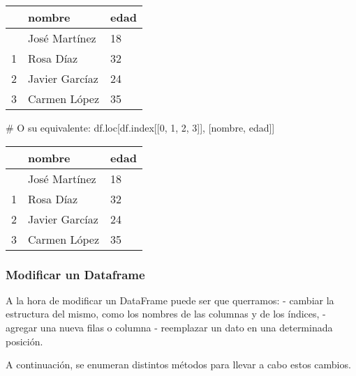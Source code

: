 \documentclass[
  letterpaper,
  DIV=11,
  numbers=noendperiod]{scrreprt}
\newenvironment{Shaded}{\begin{snugshade}}{\end{snugshade}}
\newcommand{\CommentTok}[1]{\textcolor[rgb]{0.37,0.37,0.37}{#1}}
\newcommand{\DecValTok}[1]{\textcolor[rgb]{0.68,0.00,0.00}{#1}}
\newcommand{\NormalTok}[1]{\textcolor[rgb]{0.00,0.23,0.31}{#1}}
\newcommand{\StringTok}[1]{\textcolor[rgb]{0.13,0.47,0.30}{#1}}
\begin{document}
\begin{longtable}[]{@{}lll@{}}
\toprule\noalign{}
& nombre & edad \\
\midrule\noalign{}
\endhead
\bottomrule\noalign{}
\endlastfoot
0 & José Martínez & 18 \\
1 & Rosa Díaz & 32 \\
2 & Javier Garcíaz & 24 \\
3 & Carmen López & 35 \\
\end{longtable}

\begin{Shaded}
\begin{Highlighting}[]
\CommentTok{\# O su equivalente:}
\NormalTok{df.loc[df.index[[}\DecValTok{0}\NormalTok{, }\DecValTok{1}\NormalTok{, }\DecValTok{2}\NormalTok{, }\DecValTok{3}\NormalTok{]], [}\StringTok{\textquotesingle{}nombre\textquotesingle{}}\NormalTok{, }\StringTok{\textquotesingle{}edad\textquotesingle{}}\NormalTok{]]}
\end{Highlighting}
\end{Shaded}

\begin{longtable}[]{@{}lll@{}}
\toprule\noalign{}
& nombre & edad \\
\midrule\noalign{}
\endhead
\bottomrule\noalign{}
\endlastfoot
0 & José Martínez & 18 \\
1 & Rosa Díaz & 32 \\
2 & Javier Garcíaz & 24 \\
3 & Carmen López & 35 \\
\end{longtable}

\subsubsection{Modificar un Dataframe}\label{modificar-un-dataframe}

A la hora de modificar un DataFrame puede ser que querramos: - cambiar
la estructura del mismo, como los nombres de las columnas y de los
índices, - agregar una nueva filas o columna - reemplazar un dato en una
determinada posición.

A continuación, se enumeran distintos métodos para llevar a cabo estos
cambios.
\end{document}
